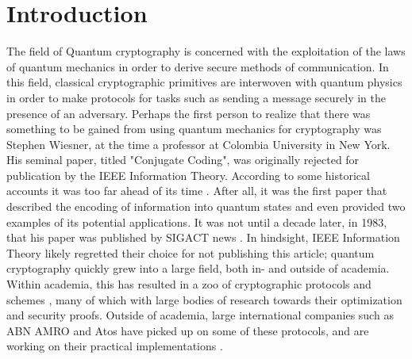 \documentclass[]{article}
\begin{document}
\section{Introduction}

The field of Quantum cryptography is concerned with the exploitation of the laws of quantum mechanics in order to derive secure methods of communication. In this field, classical cryptographic primitives are interwoven with quantum physics in order to make protocols for tasks such as sending a message securely in the presence of an adversary. Perhaps the first person to realize that there was something to be gained from using quantum mechanics for cryptography was Stephen Wiesner, at the time a professor at Colombia University in New York. His seminal paper, titled "Conjugate Coding", was originally rejected for publication by the IEEE Information Theory. According to some historical accounts it was too far ahead of its time \cite{Morsch2008}. After all, it was the first paper that described the encoding of information into quantum states and even provided two examples of its potential applications. It was not until a decade later, in 1983, that his paper was published by SIGACT news \cite{WeisnerConjugateCoding}. In hindsight, IEEE Information Theory likely regretted their choice for not publishing this article; quantum cryptography quickly grew into a large field, both in- and outside of academia. Within academia, this has resulted in a zoo of cryptographic protocols and schemes \cite{Broadbent2016}, many of which with large bodies of research towards their optimization and security proofs. Outside of academia, large international companies such as ABN AMRO and Atos have picked up on some of these protocols, and are working on their practical implementations \cite{abnamro,Buding2015}.
\end{document}
